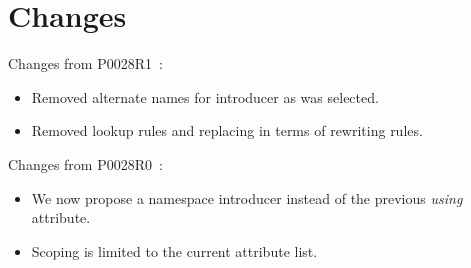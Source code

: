 \section*{Changes}

Changes from P0028R1~\cite{p0028r1}:

\begin{itemize}

\item Removed alternate names for introducer as  was selected.

\item Removed lookup rules and replacing in terms of rewriting rules.

\end{itemize}

Changes from P0028R0~\cite{p0028r0}:

\begin{itemize}

\item We now propose a namespace introducer instead of the previous \emph{using} attribute.

\item Scoping is limited to the current attribute list.

\end{itemize}

